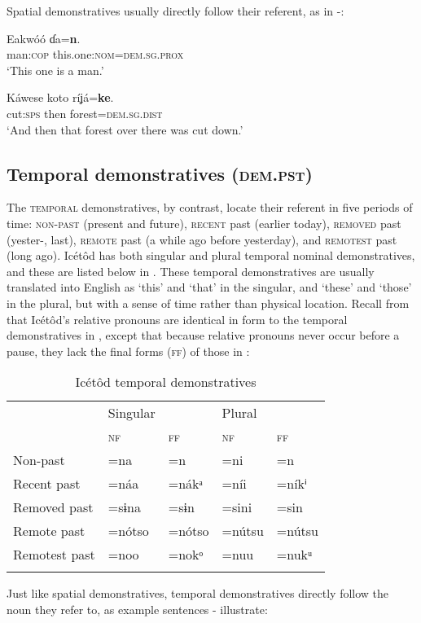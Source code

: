 Spatial demonstratives usually directly follow their referent, as in -:




\ea\label{ex:dem:1}
\gll Eakwóó   ɗa=\textbf{n}. \\
man:\textsc{cop}  this.one:\textsc{nom}=\textsc{dem.sg.prox}    \\
\glt ‘This one is a man.’ 
\z




\ea\label{ex:dem:2}
\gll Káwese   koto   ríʝá=\textbf{ke}. \\
cut:\textsc{sps}   then   forest=\textsc{dem.sg.dist}    \\
\glt ‘And then that forest over there was cut down.’ 
\z






\subsection{Temporal demonstratives (\textsc{dem.pst})}\label{sec:6.3}


The \textsc{temporal} demonstratives, by contrast, locate their referent in five periods of time: \textsc{non-past} (present and future), \textsc{recent} past (earlier today), \textsc{removed} past (yester-, last), \textsc{remote} past (a while ago before yesterday), and \textsc{remotest} past (long ago). Icétôd has both singular and plural temporal nominal demonstratives, and these are listed below in . These temporal demonstratives are usually translated into English as ‘this’ and ‘that’ in the singular, and ‘these’ and ‘those’ in the plural, but with a sense of time rather than physical location. Recall from  that Icétôd’s relative pronouns are identical in form to the temporal demonstratives in , except that because relative pronouns never occur before a pause, they lack the final forms (\textsc{ff}) of those in :


\begin{table}
\caption{Icétôd temporal demonstratives}
\label{tab:dem:temp}


\begin{tabularx}{\textwidth}{lXXXX}
\lsptoprule

& Singular &  & Plural & \\
& \textsc{nf} & \textsc{ff} & \textsc{nf} & \textsc{ff}\\
\midrule
Non-past & =na & =n & =ni & =n\\
Recent past & =náa & =nákᵃ & =níi & =níkⁱ\\
Removed past & =sɨna & =sɨn & =sini & =sin\\
Remote past & =nótso & =nótso & =nútsu & =nútsu\\
Remotest past & =noo & =nokᵒ & =nuu & =nukᵘ\\
\lspbottomrule
\end{tabularx}
\end{table}
Just like spatial demonstratives, temporal demonstratives directly follow the noun they refer to, as example sentences - illustrate:




